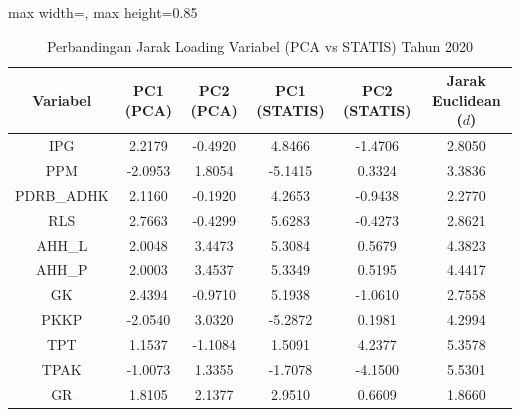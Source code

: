 \begin{table}[H]
\centering
\caption{Perbandingan Jarak Loading Variabel (PCA vs STATIS) Tahun 2020} \label{tab:appjarak_loading_2020}
\begin{adjustbox}{max width=\textwidth, max height=0.85\textheight}
\begin{tabular}{|c|c|c|c|c|c|}
\hline
\textbf{Variabel} & \textbf{PC1 (PCA)} & \textbf{PC2 (PCA)} & \textbf{PC1 (STATIS)} & \textbf{PC2 (STATIS)} & \textbf{Jarak Euclidean ($d$)} \\
\hline
IPG & 2.2179 & -0.4920 & 4.8466 & -1.4706 & 2.8050 \\
PPM & -2.0953 & 1.8054 & -5.1415 & 0.3324 & 3.3836 \\
PDRB\_ADHK & 2.1160 & -0.1920 & 4.2653 & -0.9438 & 2.2770 \\
RLS & 2.7663 & -0.4299 & 5.6283 & -0.4273 & 2.8621 \\
AHH\_L & 2.0048 & 3.4473 & 5.3084 & 0.5679 & 4.3823 \\
AHH\_P & 2.0003 & 3.4537 & 5.3349 & 0.5195 & 4.4417 \\
GK & 2.4394 & -0.9710 & 5.1938 & -1.0610 & 2.7558 \\
PKKP & -2.0540 & 3.0320 & -5.2872 & 0.1981 & 4.2994 \\
TPT & 1.1537 & -1.1084 & 1.5091 & 4.2377 & 5.3578 \\
TPAK & -1.0073 & 1.3355 & -1.7078 & -4.1500 & 5.5301 \\
GR & 1.8105 & 2.1377 & 2.9510 & 0.6609 & 1.8660 \\
\hline
\end{tabular}
\end{adjustbox}
\end{table}
